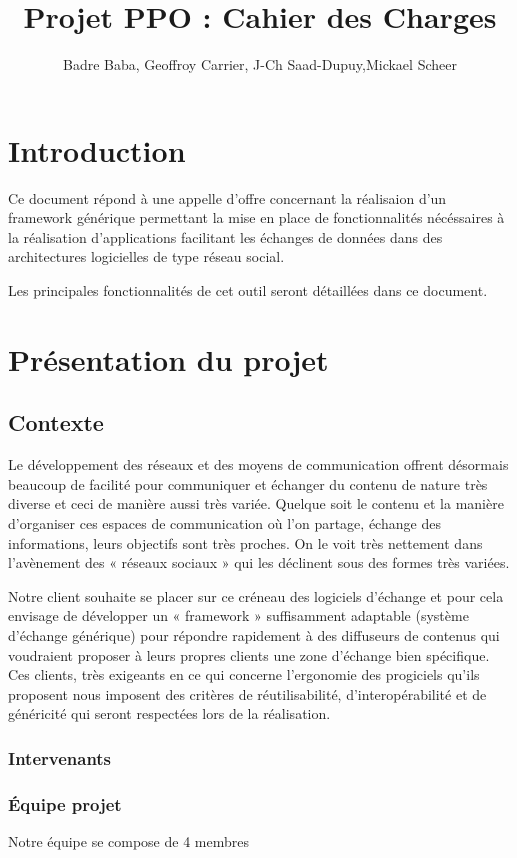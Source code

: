 \documentclass[10pt,a4paper]{article}
\title{Projet PPO : Cahier des Charges}
\author{
	Badre Baba, Geoffroy Carrier, J-Ch Saad-Dupuy,Mickael Scheer
}
\begin{document}
\maketitle

\section{Introduction}

Ce document répond à une appelle d'offre concernant la réalisaion d'un framework
générique permettant la mise en place de fonctionnalités nécéssaires à la
réalisation d'applications facilitant les échanges de données dans des architectures
logicielles de type réseau social.

Les principales fonctionnalités de cet outil seront détaillées dans ce
document.

\section{Présentation du projet}
 \subsection{Contexte}
Le développement des réseaux et des moyens de communication offrent désormais beaucoup
de facilité pour communiquer et échanger du contenu de nature très diverse et ceci de manière aussi très variée. Quelque soit le contenu et la manière d’organiser ces espaces de communication où l’on partage, échange des informations, leurs objectifs sont très proches.
On le voit très nettement dans l’avènement des « réseaux sociaux » qui les déclinent sous des formes très variées.

Notre client souhaite se placer sur ce créneau des logiciels d’échange et pour cela
envisage de développer un « framework » suffisamment adaptable (système d’échange
générique) pour répondre rapidement à des diffuseurs de contenus qui voudraient proposer à leurs propres clients une zone d’échange bien spécifique. Ces clients, très exigeants en ce qui concerne l’ergonomie des progiciels qu’ils proposent nous imposent des critères de réutilisabilité, d'interopérabilité et de généricité qui seront respectées lors de la réalisation.

  \subsubsection{Intervenants}
  \subsubsection{Équipe projet}
Notre équipe se compose de 4 membres
\end{document}
